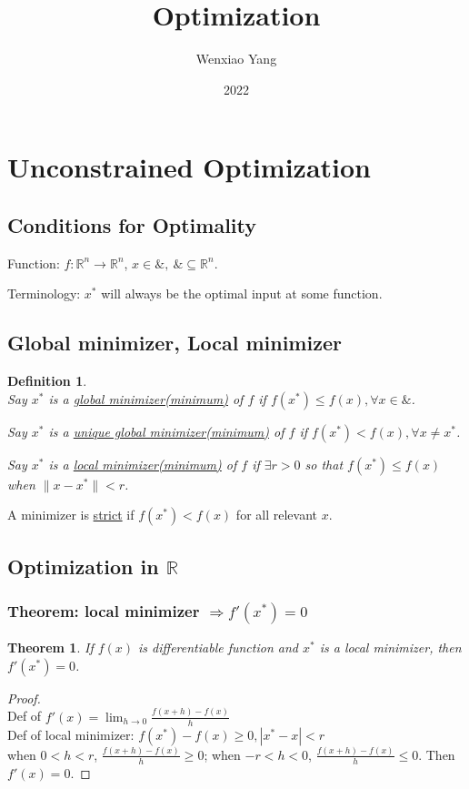 \documentclass[11pt,a4paper]{article}
\title{Optimization}
\author[*]{Wenxiao Yang}
\affil[*]{Department of Mathematics, University of Illinois at Urbana-Champaign}
\date{2022}
\newtheorem{theorem}{Theorem}
\newtheorem{definition}{Definition}
\begin{document}
\maketitle
\tableofcontents
\newpage

\section{Unconstrained Optimization}
\subsection{Conditions for Optimality}
Function: $f:\mathbb{R}^n \rightarrow	\mathbb{R}^n$, $x\in \&,\ \&\subseteq \mathbb{R}^n$.

Terminology: $x^*$ will always be the optimal input at some function.

\subsection{Global minimizer, Local minimizer}
\begin{definition}
    \quad\\
    Say $x^*$ is a \underline{global minimizer(minimum)} of $f$ if $f(x^*)\leq f(x), \forall x\in \&$.

    Say $x^*$ is a \underline{unique global minimizer(minimum)} of $f$ if $f(x^*)< f(x), \forall x\neq x^*$.

    Say $x^*$ is a \underline{local minimizer(minimum)} of $f$ if $\exists r>0$ so that $f(x^*)\leq f(x)$ when $\|x-x^*\|<r$.
\end{definition}

A minimizer is \underline{strict} if $f(x^*)< f(x)$ for all relevant $x$.

\subsection{Optimization in $\mathbb{R}$}
\subsubsection{Theorem: local minimizer $\Rightarrow f'(x^*)=0$}

\begin{theorem}
If $f(x)$ is differentiable function and $x^*$ is a local minimizer, then $f'(x^*)=0$.
\end{theorem}

\begin{proof}
\quad\\
Def of $f'(x)=\lim_{h \rightarrow 0} \frac{f(x+h)-f(x)}{h}$\\
Def of local minimizer: $f(x^*)-f(x)\geq 0, |x^*-x|<r$\\
when $0<h<r$, $\frac{f(x+h)-f(x)}{h}\geq 0$; when $-r<h<0$, $\frac{f(x+h)-f(x)}{h}\leq 0$. Then $f'(x)=0$.
\end{proof}
\end{document}
